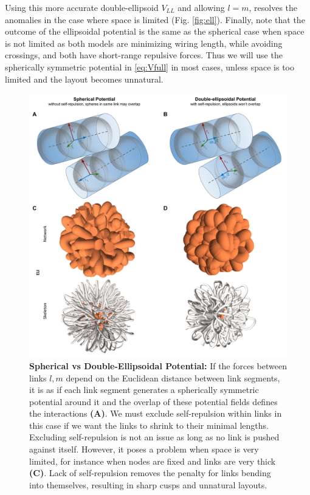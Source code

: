 \documentclass[nofootinbib,preprint,floatfix,titlepage,endfloats,superscriptaddress]{revtex4} %
\begin{document}
Using this more accurate double-ellipsoid $V_{LL}$ and allowing $l=m$, resolves the anomalies in the case where space is limited (Fig. \ref{fig:ell}). 
Finally, note that the outcome of the ellipsoidal potential is the same as the spherical case when space is not limited as both models are minimizing wiring length, while avoiding crossings, and both have short-range repulsive forces.  
Thus we will use the spherically symmetric potential in \eqref{eq:Vfull} in most cases, unless space is too limited and the layout becomes unnatural. 
\begin{figure}
    \centering
    \includegraphics[width = \columnwidth]{fig-09-19/ellipsoid.pdf}
    \caption{\scriptsize{\bf Spherical vs Double-Ellipsoidal Potential:} If the forces between links $l,m$ depend on the Euclidean distance between link segments,
    it is as if each link segment generates a spherically symmetric potential around it and the overlap of these potential fields defines the interactions {\bf(A)}. 
    We must exclude self-repulsion within links in this case if we want the links to shrink to their minimal lengths.  
    Excluding self-repulsion is not an issue as long as no link is pushed against itself. 
    However, it poses a problem when space is very limited, for instance when nodes are fixed and links are very thick {\bf(C)}. 
    Lack of self-repulsion removes the penalty for links bending into themselves, resulting in sharp cusps and unnatural layouts.  
}
\end{figure}
\end{document}
